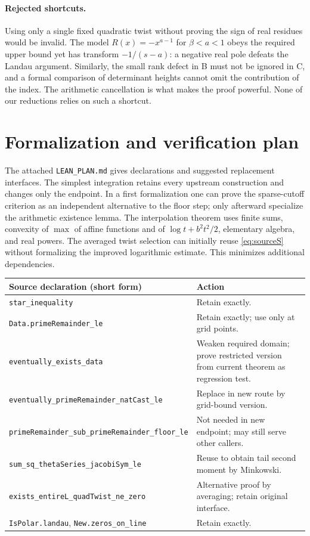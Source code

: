 \documentclass[11pt,a4paper]{article}
\theoremstyle{remark}\newtheorem{remark}[theorem]{Remark}
\begin{document}
\paragraph{Rejected shortcuts.} Using only a single fixed quadratic twist without proving the sign of real residues would be invalid. The model $R(x)=-x^{a-1}$ for $\beta<a<1$ obeys the required upper bound yet has transform $-1/(s-a)$: a negative real pole defeats the Landau argument. Similarly, the small rank defect in B must not be ignored in C, and a formal comparison of determinant heights cannot omit the contribution of the index. The arithmetic cancellation is what makes the proof powerful. None of our reductions relies on such a shortcut.

\section{Formalization and verification plan}\label{sec:formal}
The attached \texttt{LEAN\_PLAN.md} gives declarations and suggested replacement interfaces. The simplest integration retains every upstream construction and changes only the endpoint. In a first formalization one can prove the sparse-cutoff criterion as an independent alternative to the floor step; only afterward specialize the arithmetic existence lemma. The interpolation theorem uses finite sums, convexity of $\max$ of affine functions and of $\log t+b^2t^2/2$, elementary algebra, and real powers. The averaged twist selection can initially reuse \eqref{eq:sourceS} without formalizing the improved logarithmic estimate. This minimizes additional dependencies.

\begin{center}\small
\begin{tabularx}{\linewidth}{@{}p{.40\linewidth}X@{}}\toprule
Source declaration (short form)&Action\\\midrule
\texttt{star\_inequality}&Retain exactly.\\
\texttt{Data.primeRemainder\_le}&Retain exactly; use only at grid points.\\
\texttt{eventually\_exists\_data}&Weaken required domain; prove restricted version from current theorem as regression test.\\
\texttt{eventually\_primeRemainder\_}\newline\texttt{natCast\_le}&Replace in new route by grid-bound version.\\
\texttt{primeRemainder\_sub\_}\newline\texttt{primeRemainder\_floor\_le}&Not needed in new endpoint; may still serve other callers.\\
\texttt{sum\_sq\_thetaSeries\_}\newline\texttt{jacobiSym\_le}&Reuse to obtain tail second moment by Minkowski.\\
\texttt{exists\_entireL\_quadTwist\_}\newline\texttt{ne\_zero}&Alternative proof by averaging; retain original interface.\\
\texttt{IsPolar.landau}, \texttt{New.zeros\_on\_line}&Retain exactly.\\\bottomrule
\end{tabularx}
\end{center}
\end{document}
